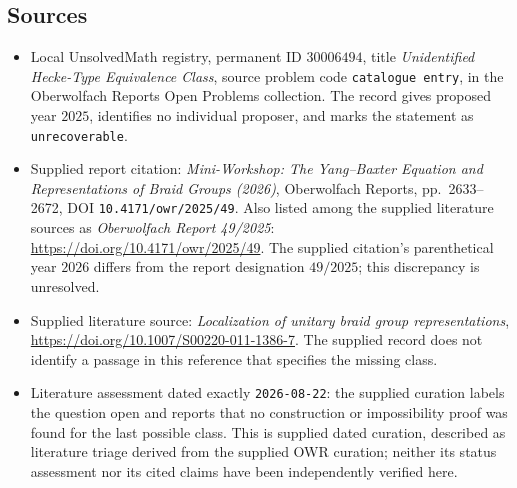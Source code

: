 \documentclass[11pt]{article}
\begin{document}
\subsection{Sources}
\begin{itemize}
\item Local UnsolvedMath registry, permanent ID \(30006494\), title \emph{Unidentified Hecke-Type Equivalence Class}, source problem code \texttt{catalogue entry}, in the Oberwolfach Reports Open Problems collection. The record gives proposed year \(2025\), identifies no individual proposer, and marks the statement as \texttt{unrecoverable}.
\item Supplied report citation: \emph{Mini-Workshop: The Yang--Baxter Equation and Representations of Braid Groups (2026)}, Oberwolfach Reports, pp.\ 2633--2672, DOI \texttt{10.4171/owr/2025/49}. Also listed among the supplied literature sources as \emph{Oberwolfach Report 49/2025}: \url{https://doi.org/10.4171/owr/2025/49}. The supplied citation's parenthetical year \(2026\) differs from the report designation \(49/2025\); this discrepancy is unresolved.
\item Supplied literature source: \emph{Localization of unitary braid group representations}, \url{https://doi.org/10.1007/S00220-011-1386-7}. The supplied record does not identify a passage in this reference that specifies the missing class.
\item Literature assessment dated exactly \texttt{2026-08-22}: the supplied curation labels the question open and reports that no construction or impossibility proof was found for the last possible class. This is supplied dated curation, described as literature triage derived from the supplied OWR curation; neither its status assessment nor its cited claims have been independently verified here.
\end{itemize}
\end{document}
